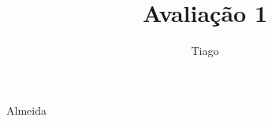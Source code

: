 \documentclass[11pt,exam]{uftex2}
\begin{document}
\sloppy
\onehalfspace

\title{Avaliação 1}
\author{Tiago}{Almeida}

\maketitle
\makeheader
 
\begin{questions}

\item

\end{questions}

\receipt
\end{document}
